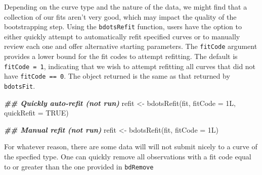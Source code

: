\documentclass[
]{article}
\newenvironment{Shaded}{\begin{snugshade}}{\end{snugshade}}
\newcommand{\AttributeTok}[1]{\textcolor[rgb]{0.77,0.63,0.00}{#1}}
\newcommand{\CommentTok}[1]{\textcolor[rgb]{0.56,0.35,0.01}{\textit{#1}}}
\newcommand{\ConstantTok}[1]{\textcolor[rgb]{0.00,0.00,0.00}{#1}}
\newcommand{\DocumentationTok}[1]{\textcolor[rgb]{0.56,0.35,0.01}{\textbf{\textit{#1}}}}
\newcommand{\FunctionTok}[1]{\textcolor[rgb]{0.00,0.00,0.00}{#1}}
\newcommand{\NormalTok}[1]{#1}
\newcommand{\OtherTok}[1]{\textcolor[rgb]{0.56,0.35,0.01}{#1}}
\newcommand{\SpecialCharTok}[1]{\textcolor[rgb]{0.00,0.00,0.00}{#1}}
\begin{document}
Depending on the curve type and the nature of the data, we might find
that a collection of our fits aren't very good, which may impact the
quality of the bootstrapping step. Using the \texttt{bdotsRefit}
function, users have the option to either quickly attempt to
automatically refit specified curves or to manually review each one and
offer alternative starting parameters. The \texttt{fitCode} argument
provides a lower bound for the fit codes to attempt refitting. The
default is \texttt{fitCode\ =\ 1}, indicating that we wish to attempt
refitting all curves that did not have \texttt{fitCode\ ==\ 0}. The
object returned is the same as that returned by \texttt{bdotsFit}.

\begin{Shaded}
\begin{Highlighting}[]
\DocumentationTok{\#\# Quickly auto{-}refit (not run)}
\NormalTok{refit }\OtherTok{\textless{}{-}} \FunctionTok{bdotsRefit}\NormalTok{(fit, }\AttributeTok{fitCode =}\NormalTok{ 1L, }\AttributeTok{quickRefit =} \ConstantTok{TRUE}\NormalTok{)}

\DocumentationTok{\#\# Manual refit (not run)}
\NormalTok{refit }\OtherTok{\textless{}{-}} \FunctionTok{bdotsRefit}\NormalTok{(fit, }\AttributeTok{fitCode =}\NormalTok{ 1L)}
\end{Highlighting}
\end{Shaded}

For whatever reason, there are some data will will not submit nicely to
a curve of the specfied type. One can quickly remove all observations
with a fit code equal to or greater than the one provided in
\texttt{bdRemove}

\begin{Shaded}
\end{Shaded}
\end{document}
